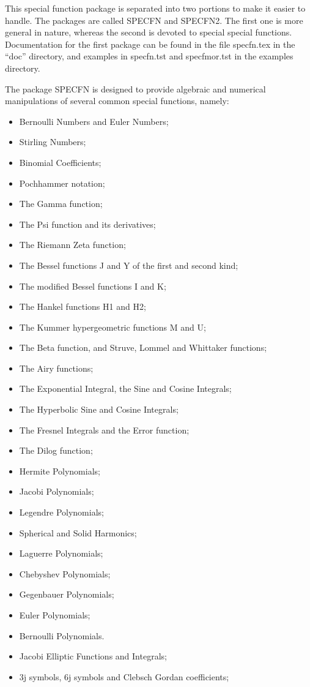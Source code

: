 This special function package is separated into two portions to make it
easier to handle.  The packages are called SPECFN and SPECFN2.  The first
one is more general in nature, whereas the second is devoted to special
special functions.  Documentation for the first package can be found in
the file specfn.tex in the ``doc'' directory, and examples in specfn.tst
and specfmor.tst in the examples directory.

The package SPECFN is designed to provide algebraic and numerical
manipulations of several common special functions, namely:

\begin{itemize}
\item Bernoulli Numbers and Euler Numbers;
\item Stirling Numbers;
\item Binomial Coefficients;
\item Pochhammer notation;
\item The Gamma function;
\item The Psi function and its derivatives;
\item The Riemann Zeta function;
\item The Bessel functions J and Y of the first and second kind;
\item The modified Bessel functions I and K;
\item The Hankel functions H1 and H2;
\item The Kummer hypergeometric functions M and U;
\item The Beta function, and Struve, Lommel and Whittaker functions;
\item The Airy functions;
\item The Exponential Integral, the Sine and Cosine Integrals;
\item The Hyperbolic Sine and Cosine Integrals;
\item The Fresnel Integrals and the Error function;
\item The Dilog function;
\item Hermite Polynomials;
\item Jacobi Polynomials;
\item Legendre Polynomials;
\item Spherical and Solid Harmonics;
\item Laguerre Polynomials;
\item Chebyshev Polynomials;
\item Gegenbauer Polynomials;
\item Euler  Polynomials;
\item Bernoulli Polynomials.
\item Jacobi Elliptic Functions and Integrals;
\item 3j symbols, 6j symbols and Clebsch Gordan coefficients;
\end{itemize}

